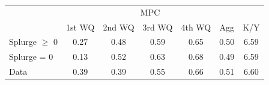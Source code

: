 \begin{tabular}{@{}lcccccc@{}} 
\toprule 
                  & \multicolumn{5}{c}{MPC} &   \\   
                  &  1st WQ  & 2nd WQ  & 3rd WQ & 4th WQ  & Agg  &  K/Y  \\  \midrule 
Splurge $\geq$ 0 &0.27 & 0.48 & 0.59 & 0.65 & 0.50 & 6.59 \\ 
Splurge = 0 &0.13 & 0.52 & 0.63 & 0.68 & 0.49 & 6.59 \\ 
Data &0.39 & 0.39 & 0.55 & 0.66 & 0.51 & 6.60 \\ \bottomrule 
\end{tabular}  
